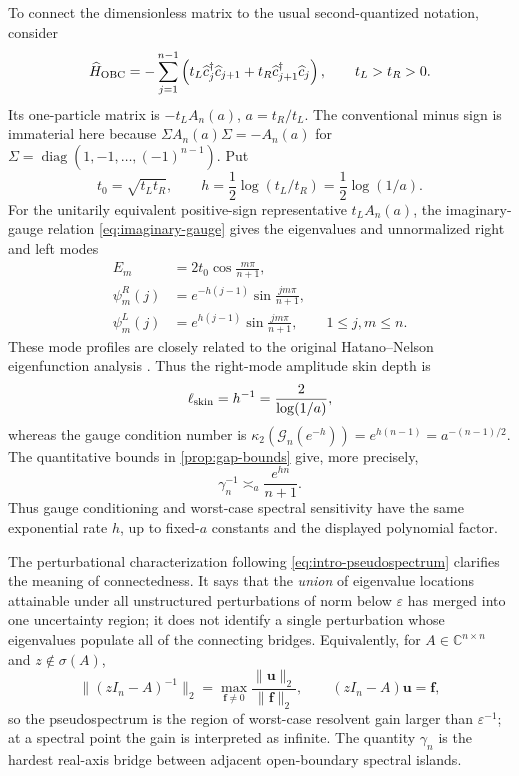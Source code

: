 \documentclass[review,hidelinks,onefignum,onetabnum]{siamart251216}
\DeclareMathOperator{\diag}{diag}
\newcommand{\C}{\mathbb C}
\begin{document}
To connect the dimensionless matrix to the usual second-quantized
notation, consider
\[
 \widehat H_{\rm OBC}=-\sum_{j=1}^{n-1}
 \left(t_L\widehat c_j^\dagger\widehat c_{j+1}
 +t_R\widehat c_{j+1}^\dagger\widehat c_j\right),
 \qquad t_L>t_R>0.
\]
Its one-particle matrix is \(-t_LA_n(a)\), \(a=t_R/t_L\).  The
conventional minus sign is immaterial here because
\(\Sigma A_n(a)\Sigma=-A_n(a)\) for
\(\Sigma=\diag(1,-1,\ldots,(-1)^{n-1})\).  Put
\[
 t_0=\sqrt{t_Lt_R},\qquad
 h=\frac12\log(t_L/t_R)
 =\frac12\log(1/a).
\]
For the unitarily equivalent positive-sign representative
\(t_LA_n(a)\), the imaginary-gauge relation
\eqref{eq:imaginary-gauge} gives the eigenvalues and unnormalized right
and left modes
\begin{equation}\label{eq:physical-modes}
\begin{aligned}
 E_m&=2t_0\cos\frac{m\pi}{n+1},\\
 \psi_m^R(j)&=e^{-h(j-1)}\sin\frac{jm\pi}{n+1},\\
 \psi_m^L(j)&=e^{h(j-1)}\sin\frac{jm\pi}{n+1},
 \qquad 1\leq j,m\leq n.
\end{aligned}
\end{equation}
These mode profiles are closely related to the original Hatano--Nelson
eigenfunction analysis \cite{HatanoNelson1998}.
Thus the right-mode amplitude skin depth is
\begin{equation}\label{eq:skin-depth}
 \ell_{\rm skin}=h^{-1}=\frac{2}{\log(1/a)},
\end{equation}
whereas the gauge condition number is
\(\kappa_2(\mathcal G_n(e^{-h}))
=e^{h(n-1)}=a^{-(n-1)/2}\).  The quantitative bounds in
\cref{prop:gap-bounds} give, more precisely,
\[
 \gamma_n^{-1}\asymp_a\frac{e^{hn}}{n+1}.
\]
Thus gauge conditioning and worst-case spectral sensitivity have the
same exponential rate \(h\), up to fixed-\(a\) constants and the displayed
polynomial factor.

The perturbational characterization following
\eqref{eq:intro-pseudospectrum}
clarifies the meaning of connectedness.  It says that the \emph{union}
of eigenvalue locations attainable under all unstructured perturbations
of norm below \(\varepsilon\) has merged into one uncertainty region;
it does not identify a single perturbation whose eigenvalues populate
all of the connecting bridges.  Equivalently, for
\(A\in\C^{n\times n}\) and \(z\notin\sigma(A)\),
\[
 \lVert(zI_n-A)^{-1}\rVert_2
 =\max_{\boldsymbol f\neq0}
 \frac{\lVert\boldsymbol u\rVert_2}{\lVert\boldsymbol f\rVert_2},
 \qquad (zI_n-A)\boldsymbol u=\boldsymbol f,
\]
so the pseudospectrum is the region of worst-case resolvent gain larger
than \(\varepsilon^{-1}\); at a spectral point the gain is interpreted as
infinite.  The quantity \(\gamma_n\) is the hardest
real-axis bridge between adjacent open-boundary spectral islands.
\end{document}
